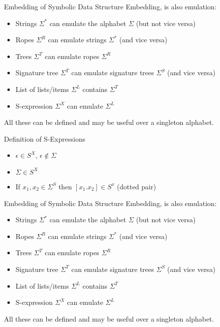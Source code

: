 \documentclass[aspectratio=169]{beamer}
\begin{document}
\begin{frame}{Embedding of Symbolic Data Structure}
Embedding, is also emulation:
\begin{itemize}
    \item Strings $\Sigma^*$ can emulate the alphabet $\Sigma$ (but not vice versa)
    \item Ropes $\Sigma^R$ can emulate strings $\Sigma^*$ (and vice versa)
    \item Trees $\Sigma^T$ can emulate ropes $\Sigma^R$ 
    \item Signature tree $\Sigma^T$ can emulate signature trees $\Sigma^S$ (and vice versa)
    \item List of lists/items $\Sigma^L$ contains $\Sigma^T$ 
    \item S-expression $\Sigma^X$ can emulate $\Sigma^L$ 
    
\end{itemize}

All these can be defined and may be useful over a singleton alphabet. 
\end{frame}

\begin{frame}{Definition of S-Expressions}
\begin{itemize}
\item $\epsilon \in S^X$, $\epsilon \not \in\Sigma$
\item $\Sigma \in S^X$
\item If $x_1,x_2\in\Sigma^S$ then $[x_1.x_2]\in S^x$ (dotted pair)
\end{itemize}
\end{frame}
\begin{frame}{Embedding of Symbolic Data Structure}
Embedding, is also emulation:
\begin{itemize}
    \item Strings $\Sigma^*$ can emulate the alphabet $\Sigma$ (but not vice versa)
    \item Ropes $\Sigma^R$ can emulate strings $\Sigma^*$ (and vice versa)
    \item Trees $\Sigma^T$ can emulate ropes $\Sigma^R$ 
    \item Signature tree $\Sigma^T$ can emulate signature trees $\Sigma^S$ (and vice versa)
    \item List of lists/items $\Sigma^L$ contains $\Sigma^T$ 
    \item S-expression $\Sigma^X$ can emulate $\Sigma^L$ 
    
\end{itemize}

All these can be defined and may be useful over a singleton alphabet. 


\end{frame}
\end{document}
